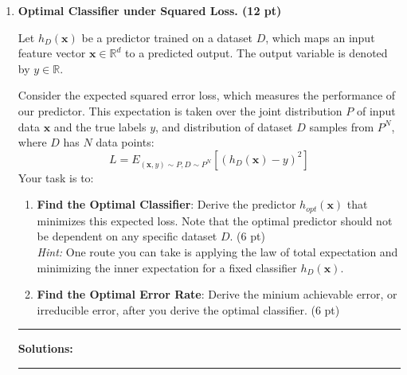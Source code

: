 \documentclass{article}
\theoremstyle{definition}
\theoremstyle{remark}
\newenvironment{Q}
    {%
      \clearpage
      \item
    }
    {%
      \phantom{s}
      \bigskip
    \hrule
    \vspace{1em}
      \textbf{Solutions: } \\
    \hrule
    }
\begin{document}
\begin{enumerate}[font={\Large\bfseries},left=0pt]
\begin{enumerate}
	\end{enumerate}

	\begin{Q}
		\textbf{\Large Optimal Classifier under Squared Loss. \textbf{(12 pt)}}

		Let $h_D(\boldsymbol{x})$ be a predictor trained on a dataset $D$, which maps an input feature vector $\boldsymbol{x}\in \mathbb{R}^d$ to a predicted output. The output variable is denoted by $y\in\mathbb{R}$.

		Consider the expected squared error loss, which measures the performance of our predictor. This expectation is taken over the joint distribution $P$ of input data $\boldsymbol{x}$ and the true labels $y$, and distribution of dataset $D$ samples from $P^N$, where $D$ has $N$ data points:
		$$L = E_{(\boldsymbol{x}, y)\sim P, D\sim P^N}\left[(h_D(\boldsymbol{x}) - y)^2\right]$$
		Your task is to:
		\begin{enumerate}
			\item \textbf{Find the Optimal Classifier}: Derive the predictor $h_{opt}(\boldsymbol{x})$ that minimizes this expected loss. Note that the optimal predictor should not be dependent on any specific dataset $D$. (6 pt) \\
			      \textit{Hint:} One route you can take is applying the law of total expectation and minimizing the inner expectation for a fixed classifier $h_D(\boldsymbol{x})$.
			\item \textbf{Find the Optimal Error Rate}: Derive the minium achievable error, or irreducible error, after you derive the optimal classifier. (6 pt)
		\end{enumerate}
	\end{Q}


\end{enumerate}
\end{document}
